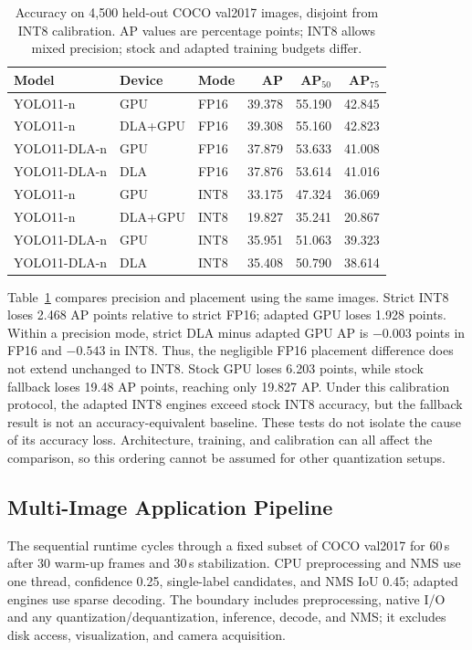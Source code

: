 \begin{table}[!b]
\caption{Accuracy on 4,500 held-out COCO val2017 images, disjoint from INT8 calibration. AP values are percentage points; INT8 allows mixed precision; stock and adapted training budgets differ.}
\label{tab:accuracy}\centering\footnotesize
\setlength{\tabcolsep}{3pt}
\begin{tabular*}{\columnwidth}{@{\extracolsep{\fill}}lllrrr@{}}
\toprule
Model & Device & Mode & AP & AP$_{50}$ & AP$_{75}$ \\
\midrule
YOLO11-n & GPU & FP16 & 39.378 & 55.190 & 42.845 \\
YOLO11-n & DLA+GPU & FP16 & 39.308 & 55.160 & 42.823 \\
YOLO11-DLA-n & GPU & FP16 & 37.879 & 53.633 & 41.008 \\
YOLO11-DLA-n & DLA & FP16 & 37.876 & 53.614 & 41.016 \\
\midrule
YOLO11-n & GPU & INT8 & 33.175 & 47.324 & 36.069 \\
YOLO11-n & DLA+GPU & INT8 & 19.827 & 35.241 & 20.867 \\
YOLO11-DLA-n & GPU & INT8 & 35.951 & 51.063 & 39.323 \\
YOLO11-DLA-n & DLA & INT8 & 35.408 & 50.790 & 38.614 \\
\bottomrule
\end{tabular*}
\end{table}
Table~\ref{tab:accuracy} compares precision and placement using the same images.
Strict INT8 loses 2.468 AP points relative to strict FP16; adapted GPU loses
1.928 points. Within a precision mode, strict DLA minus adapted GPU AP is
$-0.003$ points in FP16 and $-0.543$ in INT8. Thus, the negligible FP16
placement difference does not extend unchanged to INT8.
Stock GPU loses 6.203 points, while stock fallback loses 19.48 AP points,
reaching only 19.827 AP. Under this calibration protocol, the adapted INT8
engines exceed stock INT8 accuracy, but the fallback result is not an
accuracy-equivalent baseline. These tests do not isolate the cause of its
accuracy loss. Architecture, training, and calibration can all affect the
comparison, so this ordering cannot be assumed for other quantization setups.

\subsection{Multi-Image Application Pipeline}
\label{sec:application}
The sequential runtime cycles through a fixed subset of COCO val2017 for 60\,s after 30 warm-up frames and 30\,s stabilization. CPU preprocessing and NMS use one
thread, confidence 0.25, single-label candidates, and NMS IoU 0.45; adapted
engines use sparse decoding.
The boundary includes preprocessing, native I/O and any quantization/dequantization,
inference, decode, and NMS; it excludes disk access, visualization, and camera acquisition.

